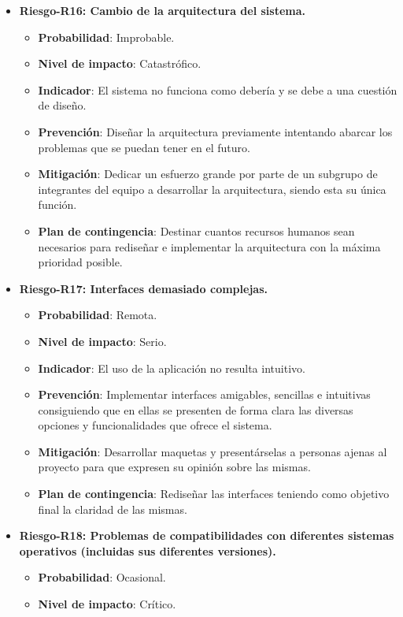 \begin{itemize}
\item { \bf Riesgo-R16: Cambio de la arquitectura del sistema.}
		\begin{itemize}	
		\item{ \bf Probabilidad}: Improbable.
		\item{ \bf Nivel de impacto}: Catastrófico.
		\item{ \bf Indicador}: El sistema no funciona como debería y se debe a una cuestión de diseño.
		\item{ \bf Prevención}: Diseñar la arquitectura previamente intentando abarcar los problemas que se puedan tener en el futuro.
		\item{ \bf Mitigación}: Dedicar un esfuerzo grande por parte de un subgrupo de integrantes del equipo a desarrollar la arquitectura, siendo esta su única función.
		\item{ \bf Plan de contingencia}: Destinar cuantos recursos humanos sean necesarios para rediseñar e implementar la arquitectura con la máxima prioridad posible.\\
		\end{itemize}
\item { \bf Riesgo-R17: Interfaces demasiado complejas.}
		\begin{itemize}	
		\item{ \bf Probabilidad}: Remota.
		\item{ \bf Nivel de impacto}: Serio.
		\item{ \bf Indicador}: El uso de la aplicación no resulta intuitivo. 
		\item{ \bf Prevención}: Implementar interfaces amigables, sencillas e intuitivas consiguiendo que en ellas se presenten de forma clara las diversas opciones y funcionalidades que ofrece el sistema.
		\item{ \bf Mitigación}: Desarrollar maquetas y presentárselas a personas ajenas al proyecto para que expresen su opinión sobre las mismas.
		\item{ \bf Plan de contingencia}: Rediseñar las interfaces teniendo como objetivo final la claridad de las mismas.\\ 
		\end{itemize}
\item { \bf Riesgo-R18: Problemas de compatibilidades con diferentes sistemas operativos (incluidas sus diferentes versiones).}
		\begin{itemize}	
		\item{ \bf Probabilidad}: Ocasional.
		\item{ \bf Nivel de impacto}: Crítico.

\end{itemize}
\end{itemize}
